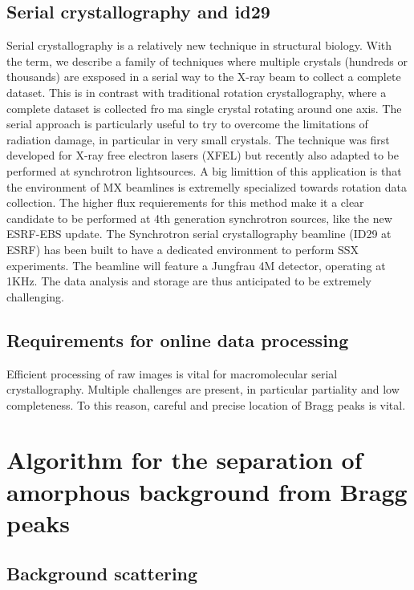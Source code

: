 \documentclass[preprint]{iucr}              %
\begin{document}
\subsection{Serial crystallography and id29}
Serial crystallography is a relatively new technique in structural biology. 
With the term, we describe a family of techniques where multiple crystals (hundreds or thousands) are exsposed in a serial way to the X-ray beam to collect a complete dataset. 
This is in contrast with traditional rotation crystallography, where a complete dataset is collected fro ma single crystal rotating around one axis. 
The serial approach is particularly useful to try to overcome the limitations of radiation damage, in particular in very small crystals.
The technique was first developed for X-ray free electron lasers (XFEL) %
but recently also adapted to be performed at synchrotron lightsources.
A big limittion of this application is that the environment of MX beamlines is extremelly specialized towards rotation data collection. %
The higher flux requierements for this method make it a clear candidate to be performed at 4th generation synchrotron sources, like the new ESRF-EBS update.
The Synchrotron serial crystallography beamline (ID29 at ESRF) has been built to have a dedicated environment to perform SSX experiments.
The beamline will feature a Jungfrau 4M detector, operating at 1KHz.
The data analysis and storage are thus anticipated to be extremely challenging. 
\subsection{Requirements for online data processing}
Efficient processing of raw images is vital for macromolecular serial crystallography.
Multiple challenges are present, in particular partiality and low completeness.
To this reason, careful and precise location of Bragg peaks is vital.

\section{Algorithm for the separation of amorphous background from Bragg peaks}
\subsection{Background scattering}
\end{document}

